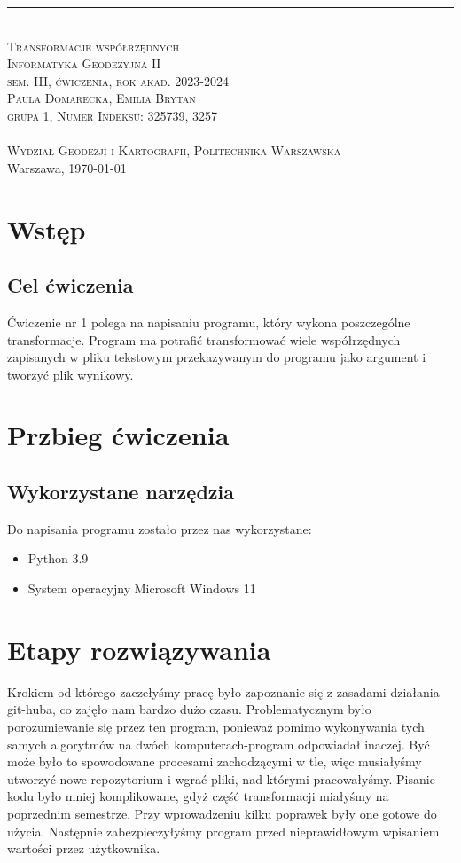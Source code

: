 \documentclass[10pt,a4paper]{article}
\newcommand{\authorName}{Paula Domarecka, Emilia Brytan \\ grupa 1, Numer Indeksu: 325739, 3257}
\newcommand{\titeReport}{Transformacje współrzędnych} %
\newcommand{\titleLecture}{Informatyka Geodezyjna II \\ sem. III, ćwiczenia, rok akad. 2023-2024} %
\newcommand{\faculty}{Wydział Geodezji i Kartografii}
\newcommand{\university}{Politechnika Warszawska}
\newcommand{\city}{Warszawa}
\begin{document}
		\rule{\textwidth}{.5pt} \\
		\vspace{1.0cm}
		\Large \textsc{\titeReport}
		\vspace{0.5cm} \\  
		\large \textsc{\titleLecture}
		\vspace{0.5cm}\\
		\textsc{\authorName}  \\
		\mymail \\
		\textsc{\faculty}, \textsc{\university}  \\ 
		\city, \today
	
	\tableofcontents
	\newpage
\section{Wstęp}
\subsection{Cel ćwiczenia}
Ćwiczenie nr 1 polega na napisaniu programu, który wykona poszczególne transformacje. Program ma potrafić transformować wiele współrzędnych zapisanych w pliku tekstowym przekazywanym do programu jako argument i tworzyć plik wynikowy. 
\section{Przbieg ćwiczenia}
\subsection{Wykorzystane narzędzia}
Do napisania programu zostało przez nas wykorzystane:
\begin{itemize}
	\item Python 3.9
	\item System operacyjny Microsoft Windows 11
\end{itemize}


\section{Etapy rozwiązywania}
Krokiem od którego zaczełyśmy pracę było zapoznanie się z zasadami działania git-huba, co zajęło nam bardzo dużo czasu. Problematycznym było porozumiewanie się przez ten program, ponieważ pomimo wykonywania tych samych algorytmów na dwóch komputerach-program odpowiadał inaczej. Być może było to spowodowane procesami zachodzącymi w tle, więc musiałyśmy utworzyć nowe repozytorium i wgrać pliki, nad którymi pracowałyśmy. Pisanie kodu było mniej komplikowane, gdyż część transformacji miałyśmy na poprzednim semestrze. Przy wprowadzeniu kilku poprawek były one gotowe do użycia. Następnie zabezpieczyłyśmy program przed nieprawidłowym wpisaniem wartości przez użytkownika.
\end{document}

